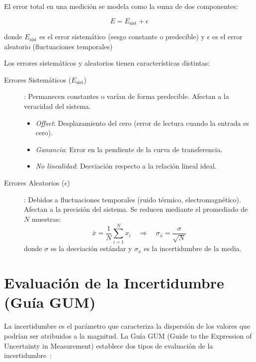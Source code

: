 El error total en una medición se modela como la suma de dos componentes:

\begin{equation}
    E = E_{\text{sist}} + \epsilon
\end{equation}

donde $E_{\text{sist}}$ es el error sistemático (sesgo constante o predecible)
y $\epsilon$ es el error aleatorio (fluctuaciones temporales)


Los errores sistemáticos y aleatorios tienen características distintas:

\begin{description}
    \item[Errores Sistemáticos ($E_{\text{sist}}$)]: Permanecen constantes o varían de forma predecible. Afectan a la veracidad del sistema.
        \begin{itemize}
            \item \emph{Offset}: Desplazamiento del cero (error de lectura cuando la entrada es cero).
            \item \emph{Ganancia}: Error en la pendiente de la curva de transferencia.
            \item \emph{No linealidad}: Desviación respecto a la relación lineal ideal.
        \end{itemize}
    \item[Errores Aleatorios ($\epsilon$)]: Debidos a fluctuaciones temporales (ruido térmico, electromagnético). Afectan a la precisión del sistema. Se reducen mediante el promediado de $N$ muestras:
        \begin{equation}
            \bar{x} = \frac{1}{N} \sum_{i=1}^{N} x_i \quad \Rightarrow \quad \sigma_{\bar{x}} = \frac{\sigma}{\sqrt{N}}
        \end{equation}
        donde $\sigma$ es la desviación estándar y $\sigma_{\bar{x}}$ es la incertidumbre de la media.
\end{description}

\section{Evaluación de la Incertidumbre (Guía GUM)}\label{sec:incertidumbre}

La incertidumbre es el parámetro que caracteriza la dispersión de los valores que podrían ser atribuidos a la magnitud. La Guía GUM (Guide to the Expression of Uncertainty in Measurement) establece dos tipos de evaluación de la incertidumbre~\cite{jcgm100_2008_gum}:

